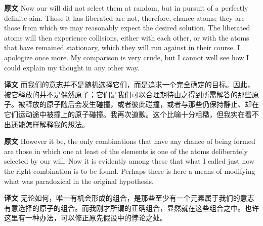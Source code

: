 \documentclass[UTF8,zihao=-4]{ctexart}
\newcommand{\BodyFont}{\fontsize{10.5pt}{15.5pt}\selectfont}
\newcommand{\origlabel}{\textbf{原文}\quad}
\newcommand{\translabel}{\textbf{译文}\quad}
\newenvironment{enblock}{\par\noindent\begingroup\BodyFont\origlabel}{\par\endgroup}
\newenvironment{zhblock}{\par\noindent\begingroup\BodyFont\translabel}{\par\endgroup\vspace{0.35em}}
\begin{document}
\begin{enblock}
Now our will did not select them at random, but in pursuit of a perfectly definite aim. Those it has liberated are not, therefore, chance atoms; they are those from which we may reasonably expect the desired solution. The liberated atoms will then experience collisions, either with each other, or with the atoms that have remained stationary, which they will run against in their course. I apologize once more. My comparison is very crude, but I cannot well see how I could explain my thought in any other way.
\end{enblock}
\begin{zhblock}
而我们的意志并不是随机选择它们，而是追求一个完全确定的目标。因此，被它释放的并不是偶然原子；它们是我们可以合理期待由之得到所需解答的那些原子。被释放的原子随后会发生碰撞，或者彼此碰撞，或者与那些仍保持静止、却在它们运动途中被撞上的原子碰撞。我再次道歉。这个比喻十分粗糙，但我实在看不出还能怎样解释我的想法。\end{zhblock}

\begin{enblock}
However it be, the only combinations that have any chance of being formed are those in which one at least of the elements is one of the atoms deliberately selected by our will. Now it is evidently among these that what I called just now the right combination is to be found. Perhaps there is here a means of modifying what was paradoxical in the original hypothesis.
\end{enblock}
\begin{zhblock}
无论如何，唯一有机会形成的组合，是那些至少有一个元素属于我们的意志有意选择的原子的组合。而我刚才所谓的正确组合，显然就在这些组合之中。也许这里有一种办法，可以修正原先假设中的悖论之处。\end{zhblock}
\end{document}

